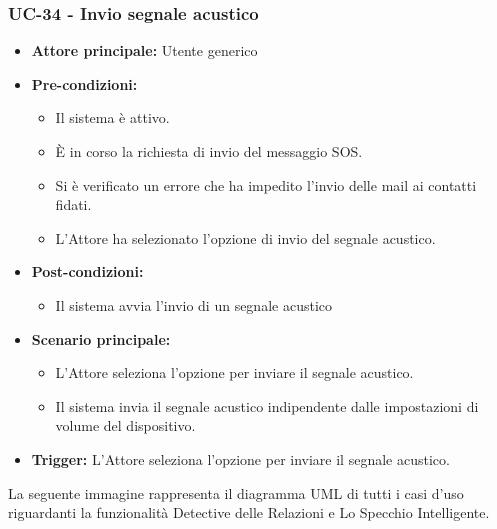 \documentclass[a4paper,12pt]{article}
\begin{document}
\subsubsection{UC-34 - Invio segnale acustico} \label{sec:UC-34}
\begin{itemize}
    \item \textbf{Attore principale:} Utente generico
    \item \textbf{Pre-condizioni:}
    \begin{itemize}
        \item Il sistema è attivo.
	    \item È in corso la richiesta di invio del messaggio SOS.
	    \item Si è verificato un errore che ha impedito l'invio delle mail ai contatti fidati.
        \item L'Attore ha selezionato l'opzione di invio del segnale acustico.
    \end{itemize}	
    \item \textbf{Post-condizioni:} 
    \begin{itemize}
        \item Il sistema avvia l'invio di un segnale acustico
    \end{itemize}
    \item \textbf{Scenario principale:} 
    \begin{itemize}
        \item L'Attore seleziona l'opzione per inviare il segnale acustico.
        \item Il sistema invia il segnale acustico indipendente dalle impostazioni di volume del dispositivo.
    \end{itemize}
    \item \textbf{Trigger:} L'Attore seleziona l'opzione per inviare il segnale acustico.
\end{itemize}


La seguente immagine rappresenta il diagramma UML di tutti i casi d'uso riguardanti la funzionalità Detective delle Relazioni e Lo Specchio Intelligente.

\end{document}
